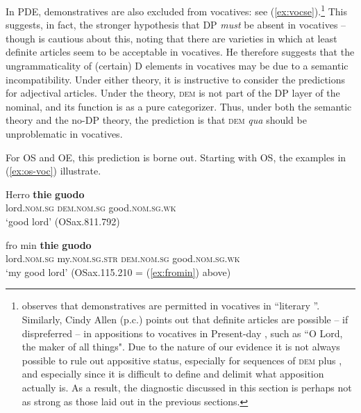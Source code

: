 \documentclass[output=paper,colorlinks,citecolor=brown]{langscibook}
\begin{document}
In PDE, demonstratives are also excluded from vocatives: see (\ref{ex:vocse}).\footnote{\citet[note 20]{longobardi1994reference} observes that demonstratives are permitted in vocatives in ``literary ''. Similarly, Cindy Allen (p.c.) points out that definite articles are possible -- if dispreferred -- in appositions to vocatives in Present-day , such as ``O Lord, the maker of all things". Due to the nature of our evidence it is not always possible to rule out appositive status, especially for  sequences of \textsc{dem} plus , and especially since it is difficult to define and delimit what apposition actually is. As a result, the diagnostic discussed in this section is perhaps not as strong as those laid out in the previous sections.} This suggests, in fact, the stronger hypothesis that DP \textit{must} be absent in vocatives -- though \citet[626--627, note 20]{longobardi1994reference} is cautious about this, noting that there are varieties in which at least definite articles seem to be acceptable in vocatives. He therefore suggests that the ungrammaticality of (certain) D elements in vocatives may be due to a semantic incompatibility. Under either theory, it is instructive to consider the predictions for adjectival articles. Under the  theory, \textsc{dem} is not part of the DP layer of the nominal, and its function is as a pure categorizer. Thus, under both the semantic theory and the no-DP theory, the prediction is that \textsc{dem} \emph{qua}  should be unproblematic in vocatives.

For OS and OE, this prediction is borne out. Starting with OS, the examples in (\ref{ex:os-voc}) illustrate.

\begin{exe}     
 \ex\label{ex:os-voc}
 \begin{xlist}
     \ex \label{ex:os-voca} \gll Herro \textbf{thie} \textbf{guodo}\\
     lord.\textsc{nom.sg} \textsc{dem.nom.sg} good.\textsc{nom.sg.wk}\\
     \glt `good lord' (OSax.811.792)
     
     \ex\gll fro min \textbf{thie} \textbf{guodo}\\
     lord.\textsc{nom.sg} my.\textsc{nom.sg.str} \textsc{dem.nom.sg} good.\textsc{nom.sg.wk}\\
     \glt `my good lord' (OSax.115.210 = (\ref{ex:fromin}) above)
 \end{xlist}
\end{exe}     
\end{document}
